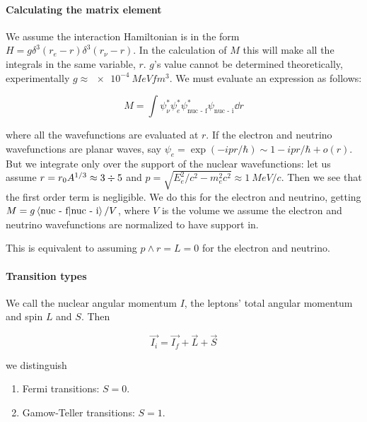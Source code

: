 \documentclass{article}
\begin{document}
\paragraph{Calculating the matrix element}

We assume the interaction Hamiltonian is in the form \(H = g \delta^3(r_e-r) \delta^3(r_\nu - r)\). In the calculation of \(M\) this will make all the integrals in the same variable, \(r\).
\(g\)'s value cannot be determined theoretically, experimentally \(g \approx \SI{e-4}{MeV fm^{3}} \).
We must evaluate an expression as follows:

\begin{equation}
    M = \int  \psi_\nu^* \psi_e^* \psi_{\text{nuc - f}}^* \psi_{\text{nuc - i}}  \dd{r}
\end{equation}

where all the wavefunctions are evaluated at \(r\). If the electron and neutrino wavefunctions are planar waves, say \(\psi_e = \exp(-ipr/\hbar) \sim 1 - ipr/\hbar + o(r)\). But we integrate only over the support of the nuclear wavefunctions: let us assume \(r = r_0 A^{1/3} \approx 3 \divisionsymbol 5\) and \(p = \sqrt{E_e^2/c^2 - m_e^2 c^2} \approx \SI{1}{MeV/c}  \). Then we see that the first order term is negligible. We do this for the electron and neutrino, getting
\(M = g \braket{\text{nuc - f}}{\text{nuc - i}}/V \), where \(V\) is the volume we assume the electron and neutrino wavefunctions are normalized to have support in.

This is equivalent to assuming \(p \wedge r = L = 0\) for the electron and neutrino.

\paragraph{Transition types}

We call the nuclear angular momentum \(I\), the leptons' total angular momentum and spin \(L\) and \(S\). Then

\begin{equation}
    \vec{I_i} = \vec{I_f} + \vec{L} + \vec{S}
\end{equation}

we distinguish

\begin{enumerate}
     \item Fermi transitions: \(S = 0\).
    \item Gamow-Teller transitions: \(S = 1\).
\end{enumerate}
\end{document}
